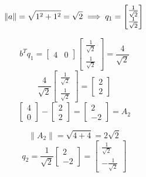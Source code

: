 \documentclass[9pt]{article}
\theoremstyle{plain}
\begin{document}
\[
	\left\| a \right\| = \sqrt{1^2 + 1^2} = \sqrt{2} \implies q_1 =
	\begin{bmatrix}
		\frac{1}{\sqrt{2}} \\
		\frac{1}{\sqrt{2}}
	\end{bmatrix}
	\\
\]

\[
	b^Tq_1 = \begin{bmatrix} 4 & 0 \end{bmatrix}
	\begin{bmatrix}
		\frac{1}{\sqrt{2}} \\
		\frac{1}{\sqrt{2}}
	\end{bmatrix}
	= \frac{4}{\sqrt{2}}
\]
\[
	\frac{4}{\sqrt{2}}
	\begin{bmatrix}
		\frac{1}{\sqrt{2}} \\
		\frac{1}{\sqrt{2}}
	\end{bmatrix}
	=
	\begin{bmatrix}
		2 \\
		2
	\end{bmatrix}
\]
\[
	\begin{bmatrix}
		4 \\ 0
	\end{bmatrix} -
	\begin{bmatrix}
		2 \\
		2
	\end{bmatrix} =
	\begin{bmatrix}
		2 \\ -2
	\end{bmatrix} = A_2
\]

\[
	\left\| A_2 \right\| = \sqrt{4 + 4} = 2 \sqrt{2}
\]
\[
	q_2 = \frac{1}{\sqrt{2}}
	\begin{bmatrix}
		2 \\ -2
	\end{bmatrix} =
	\begin{bmatrix}
		\frac{1}{\sqrt{2}} \\
		-\frac{1}{\sqrt{2}}
	\end{bmatrix}
\]
\end{document}
